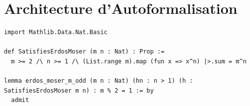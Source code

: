 \documentclass[12pt, a4paper]{article}
\begin{document}
\section{Architecture d'Autoformalisation}
\begin{lstlisting}[language=lean, basicstyle=\ttfamily\small, breaklines=true]
import Mathlib.Data.Nat.Basic

def SatisfiesErdosMoser (m n : Nat) : Prop :=
  m >= 2 /\ n >= 1 /\ (List.range m).map (fun x => x^n) |>.sum = m^n

lemma erdos_moser_m_odd (m n : Nat) (hn : n > 1) (h : SatisfiesErdosMoser m n) : m % 2 = 1 := by
  admit
\end{lstlisting}
\end{document}
